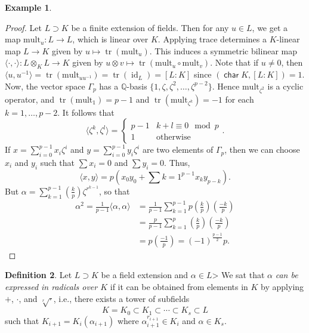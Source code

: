 \documentclass[10pt,letterpaper,cm]{nupset}
\theoremstyle{definition}
\newtheorem{definition}{Definition}[subsection]
\newtheorem{exmp}[definition]{Example}
\theoremstyle{theorem}
\theoremstyle{remark}
\newcommand{\Q}{\mathbb Q}
\newcommand{\1}{\mathbf{1}}
\newcommand{\0}{\vec 0}
\DeclareMathOperator{\Char}{\mathsf{char}}
\DeclareMathOperator{\id}{id}
\DeclareMathOperator{\tr}{tr}
\begin{document}
\begin{exmp}
\begin{enumerate}
\begin{proof}
Let $L \supset K$ be a finite extension of fields. Then for any $u\in L$, we get a map $\text{mult}_u : L \to L$, which is linear over $K$. Applying trace determines a $K$-linear map $L \to K$ given by $u \mapsto \tr(\text{mult}_u)$. This induces a symmetric bilinear map $\langle \cdot, \cdot \rangle : L \otimes_K L \to K$ given by $u \otimes v \mapsto \tr(\text{mult}_u \circ \text{mult}_v)$. Note that if $u \ne 0$, then $\langle u, u^{-1} \rangle = \tr(\text{mult}_{uu^{-1}}) = \tr(\id_L) =[L:K] $ since $(\Char{K}, [L:K])=1$. Now, the vector space $\Gamma_p$ has a $\Q$-basis $\{1, \zeta, \zeta^2, \ldots, \zeta^{p-2}\}$. Hence $\text{mult}_{\zeta^2}$ is a cyclic operator, and $\tr(\text{mult}_1) = p-1$ and $\tr(\text{mult}_{\zeta^k}) = {-1}$ for each $k=1, \ldots, p-2$. It follows that $$ \langle \zeta^k, \zeta^l \rangle = \begin{cases}  p-1 & k+l \equiv 0 \mod p \\ 1 & \text{otherwise}   \end{cases}.$$ If $x = \sum_{i=0}^{p-1} x_i \zeta^i$ and $y = \sum_{i=0}^{p-1} y_i \zeta^i$ are two elements of $\Gamma_p$, then we can choose $x_i$ and $y_i$ such that $\sum x_i = 0$ and $\sum y_i= 0$. Thus, $$\langle x, y \rangle = p(x_0y_0 + \sum{k=1}^{p-1} x_k y_{p-k}).$$ But $\alpha = \sum_{k=1}^{p-1} \left(\frac{k}{p} \right) \zeta^{r^{k-1}}$, so that \begin{align*}
 \alpha^2 = \frac{1}{p-1} \langle \alpha, \alpha \rangle & = \frac{1}{p-1} \sum_{k=1}^{p-1} p \left(\frac{k}{p} \right) \left(\frac{{-}k}{p} \right) \\ &= \frac{p}{p-1} \sum_{k=1}^{p} \left(\frac{k}{p} \right) \left(\frac{{-}k}{p} \right) \\ & = p \left(\frac{-1}{p} \right) = ({-}1)^{\frac{p-1}{2}}p
. \end{align*}
\end{proof}
\end{enumerate}
\end{exmp}

\begin{definition}
Let $L \supset K$ be a field extension and $\alpha \in L$> We sat that $\alpha$ \textit{can be expressed in radicals over $K$} if it can be obtained from elements in $K$ by applying $+$, $\cdot$, and $\sqrt[r]{\cdot}$, i.e., there exists a tower of subfields $$ K = K_0 \subset K_1 \subset \cdots \subset K_s \subset L  $$ such that $K_{i+1} = K_i(\alpha_{i+1})$ where $\alpha_{i+1}^{r_{i+1}} \in K_i$ and $\alpha \in K_s$. 
\end{definition}
\end{document}
